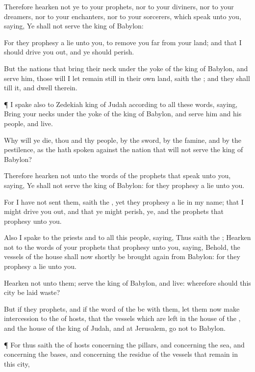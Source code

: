 {Therefore
hearken not ye to your
prophets, nor to your
diviners, nor to your
dreamers, nor to your
enchanters, nor to your
sorcerers, which
speak unto you,
saying, Ye shall not
serve the
king of
Babylon:

For they
prophesy a
lie unto you, to remove you
far from your
land; and that I should drive you
out, and ye should
perish.

But the
nations that
bring their
neck under the
yoke of the
king of
Babylon, and
serve him, those will I let remain
still in their own
land,
saith the
{}; and they shall
till it, and
dwell therein.


\par }{\PP {}¶ I
spake also to
Zedekiah
king of
Judah according to all these
words,
saying,
Bring your
necks under the
yoke of the
king of
Babylon, and
serve him and his
people, and
live.

Why will ye
die, thou and thy
people, by the
sword, by the
famine, and by the
pestilence, as the
{} hath
spoken against the
nation that will not
serve the
king of
Babylon?

Therefore
hearken not unto the
words of the
prophets that
speak unto you,
saying, Ye shall not
serve the
king of
Babylon: for they
prophesy a
lie unto you.

For I have not
sent them,
saith the
{}, yet they
prophesy a
lie in my
name; that I might drive you
out, and that ye might
perish, ye, and the
prophets that
prophesy unto you.

Also I
spake to the
priests and to all this
people,
saying, Thus
saith the
{};
Hearken not to the
words of your
prophets that
prophesy unto you,
saying, Behold, the
vessels of the
{}
house shall now
shortly be brought
again from
Babylon: for they
prophesy a
lie unto you.

Hearken not unto them;
serve the
king of
Babylon, and
live: wherefore should this
city be laid
waste?

But if they
{}
prophets, and if the
word of the
{}
be with them, let them now make
intercession to the
{} of
hosts, that the
vessels which are
left in the
house of the
{}, and
{} the
house of the
king of
Judah, and at
Jerusalem,
go not to
Babylon.


\par }{\PP {}¶ For thus
saith the
{} of
hosts concerning the
pillars, and concerning the
sea, and concerning the
bases, and concerning the
residue of the
vessels that
remain in this
city,

}
